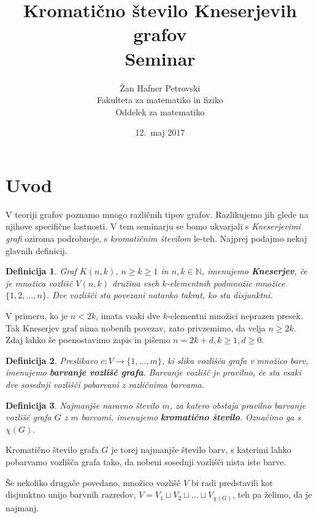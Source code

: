 \documentclass[a4paper,12pt]{article}
\title{Kromatično število Kneserjevih grafov \\ 
\Large Seminar}
\author{Žan Hafner Petrovski \\
Fakulteta za matematiko in fiziko \\
Oddelek za matematiko}
\date{12.\ maj 2017}
\newtheorem{definicija}{Definicija}
\begin{document}
 
\maketitle
\newpage


\section{Uvod}

V teoriji grafov poznamo mnogo različnih tipov grafov. Razlikujemo jih glede na njihove specifične lastnosti. V tem seminarju se bomo ukvarjali s {\em Kneserjevimi grafi} oziroma podrobneje, s {\em kromatičnim številom} le-teh. Najprej podajmo nekaj glavnih definicij.

\begin{definicija}
Graf $K(n,k)$, $n \geq k \geq 1$ in $n, k \in \mathbb{N}$, imenujemo \mbox{\textbf{Kneserjev}}, če je množica vozlišč $V(n,k)$ družina vseh $k$-elementnih podmnožic množice $\{1, 2, \ldots, n\}$. Dve vozlišči sta povezani natanko takrat, ko sta disjunktni. 
\end{definicija}

V primeru, ko je $n < 2k$, imata vsaki dve $k$-elementni množici neprazen presek. Tak Kneserjev graf nima nobenih povezav, zato privzemimo, da velja $n \geq 2k$. 
Zdaj lahko še poenostavimo zapis in pišemo $n = 2k + d, k \geq 1, d \geq 0$.

\begin{definicija}
Preslikavo $c: V \rightarrow \{1, \ldots, m\}$, ki slika vozlišča grafa v množico barv, imenujemo \textbf {barvanje vozlišč grafa}. Barvanje vozlišč je pravilno, če sta vsaki dve sosednji vozlišči pobarvani z različnima barvama.
\end{definicija}

\begin{definicija}
Najmanjše naravno število $m$, za katero obstaja pravilno barvanje vozlišč grafa $G$ z $m$ barvami, imenujemo \textbf {kromatično število}. Označimo ga s $\chi(G).$
\end{definicija}

Kromatično število grafa $G$ je torej najmanjše število barv, s katerimi lahko pobarvamo vozlišča grafa tako, da nobeni sosednji vozlišči nista iste barve. 

Še nekoliko drugače povedano, množico vozlišč $V$ bi radi predstavili kot disjunktno unijo barvnih razredov, $V = V_1 \sqcup V_2 \sqcup \ldots \sqcup V_{\chi(G)}$, teh pa želimo, da je najmanj. 
\end{document}
